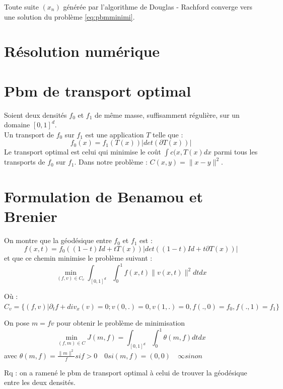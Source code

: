 \documentclass[a4paper,12pt]{article}
\begin{document}
\begin{propriete}
Toute suite $(x_n)$ générée par l'algorithme de Douglas - Rachford converge vers une solution du problème \ref{eq:pbmminimi}.
\end{propriete}








\newpage


\section{Résolution numérique}
\label{sec:numerique}















\newpage

\section{Pbm de transport optimal}
Soient deux densités $f_0$ et $f_1$ de même masse, suffisamment régulière, sur un domaine $[0,1]^d$.\\
Un transport de $f_0$ sur $f_1$ est une application $T$ telle que :
$$
f_0(x)=f_1(T(x))|det(\partial T(x))|
$$
Le transport optimal est celui qui minimise le coût $\int c(x,T(x)dx$ parmi tous les transports de $f_0$ sur $f_1$. Dans notre problème : $C(x,y) =\|x-y\|^2$. 

\section{Formulation de Benamou et Brenier}
On montre que la géodésique entre $f_0$ et $f_1$ est : 
$$
f(x,t)=f_0((1-t)Id+tT(x))|det((1-t)Id+t\partial T(x))|
$$
et que ce chemin minimise le problème suivant : 
$$
\min_{(f,v)\in C_v} \int_{[0,1]^d}\int_0^1 f(x,t)\|v(x,t)\|^2dtdx
$$

Où : $C_v= \{(f,v)|\partial_t f+div_x(v)=0;v(0,.)=0,v(1,.)=0,f(.,0)=f_0,f(.,1)=f_1\}$

On pose $m = fv$ pour obtenir le problème de minimisation 
$$
\min_{(f,m)\in C}J(m,f)=\int_{[0,1]^d}\int_0^1 \theta (m,f)dtdx
$$
avec $\theta (m,f) = \frac{\|m\|^2}{f} si f>0 \quad 0 si (m,f)=(0,0)\quad \infty sinon$

Rq : on a ramené le pbm de transport optimal à celui de trouver la géodésique entre les deux densités. 
\end{document}

